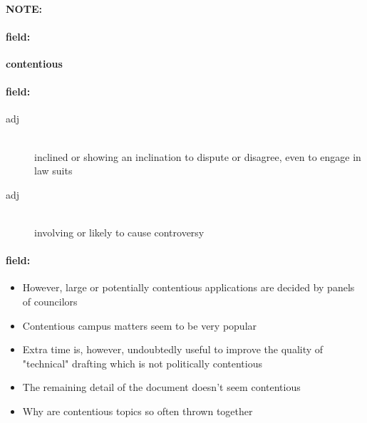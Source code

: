 \documentclass[12pt]{article}
\newenvironment{note}{\paragraph{NOTE:}}{}
\newenvironment{field}{\paragraph{field:}}{}
\begin{document}
\begin{note}
\begin{field}
\textbf{\large contentious}
\end{field}


\begin{field}
\begin{description}
\item[adj] \hfill \\ 
inclined or showing an inclination to dispute or disagree, even to engage in law suits

\item[adj] \hfill \\ 
involving or likely to cause controversy

\end{description}
\end{field}

\begin{field}
\begin{itemize}
\item However, large or potentially contentious applications are decided by panels of councilors
\item Contentious campus matters seem to be very popular
\item Extra time is, however, undoubtedly useful to improve the quality of "technical" drafting which is not politically contentious
\item The remaining detail of the document doesn't seem contentious
\item Why are contentious topics so often thrown together
\end{itemize}
\end{field}
\end{note}
\end{document}
